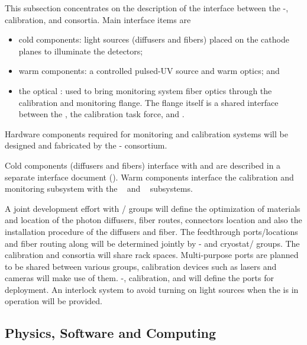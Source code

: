This subsection concentrates on the description of the interface between the  -, calibration, and  consortia. 
Main interface items are

\begin{itemize}
    \item cold components: light sources (diffusers and fibers) placed on the cathode planes to illuminate the detectors;
    \item warm components: a controlled pulsed-UV source and warm optics; and 
 
    \item the optical \fdth: used to  bring monitoring system fiber optics through the calibration and monitoring flange.  The flange itself is a shared interface between the , the calibration task force, and .
\end{itemize}

Hardware components required for  monitoring and calibration systems will be designed and fabricated by the - consortium. 

Cold components (diffusers and fibers) interface with  and are described in a separate interface document (). Warm components interface the  calibration and monitoring subsystem with the ~ and ~ subsystems.

A joint development effort with / groups will define the optimization of materials and location of the photon diffusers, fiber routes, connectors location and also the installation procedure of the diffusers and fiber. The feedthrough ports/locations and fiber routing along  will be determined jointly by - and cryostat/ groups. The %
calibration and  %
consortia will share rack spaces. Multi-purpose ports are planned to be shared between various groups, calibration devices such as lasers and cameras will make use of them. %
-, calibration, and  will define the ports for deployment. An interlock system to avoid turning on light sources when the  is in operation will be provided.

\subsection{Physics, Software and Computing}


